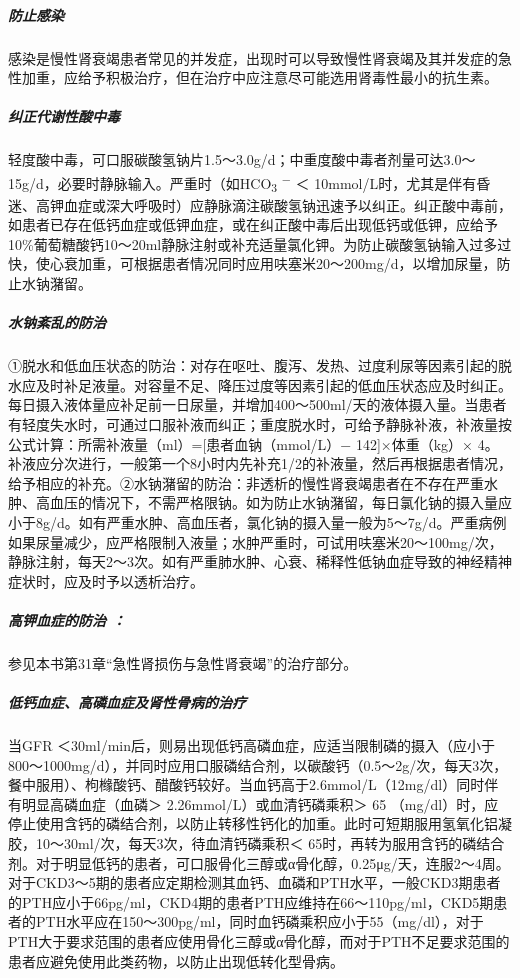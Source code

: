 \subparagraph{防止感染}

感染是慢性肾衰竭患者常见的并发症，出现时可以导致慢性肾衰竭及其并发症的急性加重，应给予积极治疗，但在治疗中应注意尽可能选用肾毒性最小的抗生素。

\subparagraph{纠正代谢性酸中毒}

轻度酸中毒，可口服碳酸氢钠片1.5～3.0g/d；中重度酸中毒者剂量可达3.0～15g/d，必要时静脉输入。严重时（如HCO\textsubscript{3}
\textsuperscript{−} ＜
10mmol/L时，尤其是伴有昏迷、高钾血症或深大呼吸时）应静脉滴注碳酸氢钠迅速予以纠正。纠正酸中毒前，如患者已存在低钙血症或低钾血症，或在纠正酸中毒后出现低钙或低钾，应给予10\%葡萄糖酸钙10～20ml静脉注射或补充适量氯化钾。为防止碳酸氢钠输入过多过快，使心衰加重，可根据患者情况同时应用呋塞米20～200mg/d，以增加尿量，防止水钠潴留。

\subparagraph{水钠紊乱的防治}

①脱水和低血压状态的防治：对存在呕吐、腹泻、发热、过度利尿等因素引起的脱水应及时补足液量。对容量不足、降压过度等因素引起的低血压状态应及时纠正。每日摄入液体量应补足前一日尿量，并增加400～500ml/天的液体摄入量。当患者有轻度失水时，可通过口服补液而纠正；重度脱水时，可给予静脉补液，补液量按公式计算：所需补液量（ml）={[}患者血钠（mmol/L）−
142{]}×体重（kg）×
4。补液应分次进行，一般第一个8小时内先补充1/2的补液量，然后再根据患者情况，给予相应的补充。②水钠潴留的防治：非透析的慢性肾衰竭患者在不存在严重水肿、高血压的情况下，不需严格限钠。如为防止水钠潴留，每日氯化钠的摄入量应小于8g/d。如有严重水肿、高血压者，氯化钠的摄入量一般为5～7g/d。严重病例如果尿量减少，应严格限制入液量；水肿严重时，可试用呋塞米20～100mg/次，静脉注射，每天2～3次。如有严重肺水肿、心衰、稀释性低钠血症导致的神经精神症状时，应及时予以透析治疗。

\subparagraph{高钾血症的防治 ：}

参见本书第31章“急性肾损伤与急性肾衰竭”的治疗部分。

\subparagraph{低钙血症、高磷血症及肾性骨病的治疗}

当GFR
＜30ml/min后，则易出现低钙高磷血症，应适当限制磷的摄入（应小于800～1000mg/d），并同时应用口服磷结合剂，以碳酸钙（0.5～2g/次，每天3次，餐中服用）、枸橼酸钙、醋酸钙较好。当血钙高于2.6mmol/L（12mg/dl）同时伴有明显高磷血症（血磷＞
2.26mmol/L）或血清钙磷乘积＞ 65
（mg/dl）时，应停止使用含钙的磷结合剂，以防止转移性钙化的加重。此时可短期服用氢氧化铝凝胶，10～30ml/次，每天3次，待血清钙磷乘积＜
65时，再转为服用含钙的磷结合剂。对于明显低钙的患者，可口服骨化三醇或α骨化醇，0.25μg/天，连服2～4周。对于CKD3～5期的患者应定期检测其血钙、血磷和PTH水平，一般CKD3期患者的PTH应小于66pg/ml，CKD4期的患者PTH应维持在66～110pg/ml，CKD5期患者的PTH水平应在150～300pg/ml，同时血钙磷乘积应小于55（mg/dl），对于PTH大于要求范围的患者应使用骨化三醇或α骨化醇，而对于PTH不足要求范围的患者应避免使用此类药物，以防止出现低转化型骨病。

